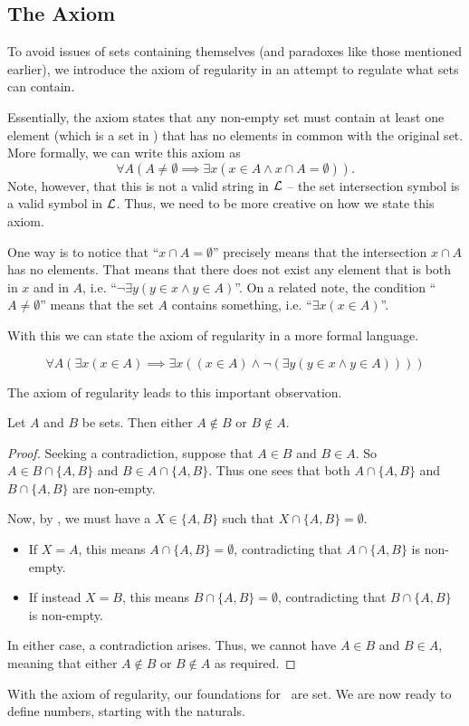\subsection{The Axiom}
To avoid issues of sets containing themselves (and paradoxes like those mentioned earlier), we introduce the axiom of regularity in an attempt to regulate what sets can contain.

Essentially, the axiom states that any non-empty set must contain at least one element (which is a set in \ZFC) that has no elements in common with the original set. More formally, we can write this axiom as
\[
    \forall A \left(A \neq \emptyset \implies \exists x \left(x \in A  \land x \cap A = \emptyset\right)\right).
\]
Note, however, that this is not a valid string in $\mathcal{L}$ -- the set intersection symbol is a valid symbol in $\mathcal{L}$. Thus, we need to be more creative on how we state this axiom.

One way is to notice that ``$x \cap A = \emptyset$'' precisely means that the intersection $x \cap A$ has no elements. That means that there does not exist any element that is both in $x$ and in $A$, i.e. ``$\lnot \exists y (y \in x \land y \in A)$''. On a related note, the condition ``$A \neq \emptyset$'' means that the set $A$ contains something, i.e. ``$\exists x (x \in A)$''.

With this we can state the axiom of regularity in a more formal language.

\begin{axiom}[Regularity]\label{axiom:regularity}
    \vspace{-10px}
    \[
        \forall A (\exists x (x \in A) \implies \exists x ((x \in A) \land \lnot(\exists y (y \in x \land y \in A))))
    \]
\end{axiom}

The axiom of regularity leads to this important observation.

\begin{proposition}\label{prop:regularity-no-recursive-inclusions}
    Let $A$ and $B$ be sets. Then either $A \notin B$ or $B \notin A$.
\end{proposition}
\begin{proof}
    Seeking a contradiction, suppose that $A \in B$ and $B \in A$. So $A \in B \cap \{A, B\}$ and $B \in A \cap \{A, B\}$. Thus one sees that both $A \cap \{A, B\}$ and $B \cap \{A, B\}$ are non-empty.

    Now, by , we must have a $X \in \{A, B\}$ such that $X \cap \{A, B\} = \emptyset$.
    \begin{itemize}
        \item If $X = A$, this means $A \cap \{A, B\} = \emptyset$, contradicting that $A \cap \{A, B\}$ is non-empty.
        \item If instead $X = B$, this means $B \cap \{A, B\} = \emptyset$, contradicting that $B \cap \{A, B\}$ is non-empty.
    \end{itemize}
    In either case, a contradiction arises. Thus, we cannot have $A \in B$ and $B \in A$, meaning that either $A \notin B$ or $B \notin A$ as required.
\end{proof}

With the axiom of regularity, our foundations for \ZFC~are set. We are now ready to define numbers, starting with the naturals.
